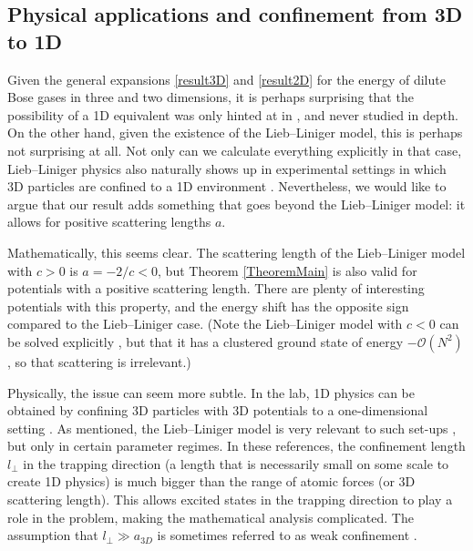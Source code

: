 \documentclass[a4paper,11pt]{article}
\numberwithin{equation}{section}
\begin{document}
	
	
	
	\subsection{Physical applications and confinement from 3D to 1D}
	\label{SecConfinement}
	Given the general expansions \eqref{result3D} and \eqref{result2D} for the energy of dilute Bose gases in three and two dimensions, it is perhaps surprising that the possibility of a 1D equivalent was only hinted at in \cite{astrakharchik2010low}, and never studied in depth. On the other hand, given the existence of the Lieb--Liniger model, this is perhaps not surprising at all. Not only can we calculate everything explicitly in that case, Lieb--Liniger physics also naturally shows up in experimental settings in which 3D particles are confined to a 1D environment \cite{olshanii1998atomic,lieb2003one,lieb2004one,seiringer2008lieb}. Nevertheless, we would like to argue that our result adds something that goes beyond the Lieb--Liniger model: it allows for positive scattering lengths $a$.
	
	Mathematically, this seems clear. The scattering length of the Lieb--Liniger model with $c>0$ is $a=-2/c<0$, but Theorem \ref{TheoremMain} is also valid for potentials with a positive scattering length. There are plenty of interesting potentials with this property, and the energy shift has the opposite sign compared to the Lieb--Liniger case. (Note the Lieb--Liniger model with $c<0$ can be solved explicitly \cite{calabrese2007correlation}, but that it has a clustered ground state of energy $-\mathcal{O}(N^2)$ \cite{lieb1963exact,mcguire1964study}, so that scattering is irrelevant.)
	
	Physically, the issue can seem more subtle. In the lab, 1D physics can be obtained by confining 3D particles with 3D potentials to a one-dimensional setting \cite{schreck2001quasipure,gorlitz2001realization,greiner2001exploring,moritz2003exciting}. As mentioned, the Lieb--Liniger model is very relevant to such set-ups \cite{olshanii1998atomic,lieb2003one,lieb2004one,seiringer2008lieb}, but only in certain parameter regimes. In these references, the confinement length $l_\perp$ in the trapping direction (a length that is necessarily small on some scale to create 1D physics) is much bigger than the range of atomic forces (or 3D scattering length). This allows excited states in the trapping direction to play a role in the problem, making the mathematical analysis complicated. The assumption that $l_\perp\gg a_{3D}$ is sometimes referred to as weak confinement \cite{bloch2008many}. 
	
\end{document}
